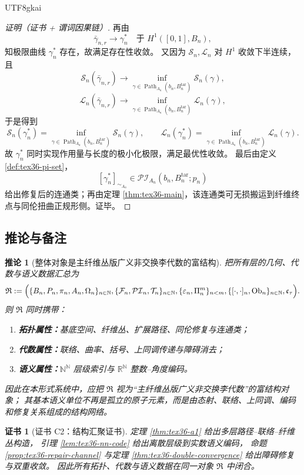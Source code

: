 \documentclass[12pt]{article}
\newtheorem{corollary}{推论}[section]
\newtheorem{Certificate}{证书}[section]
\newcommand{\NN}{\mathbb{N}}
\newcommand{\RR}{\mathbb{R}}
\newcommand{\Path}{\operatorname{Path}}
\newcommand{\Ob}{\operatorname{Ob}}
\begin{document}
\begin{CJK*}{UTF8}{gkai}
\begin{proof}[证明（证书 + 谓词因果链）]
再由
\[
  \bar{\gamma}_{n,r}\to \gamma_n^\ast
  \quad\text{于 } H^1([0,1],B_n),
\]
知极限曲线 $\gamma_n^\ast$ 存在，故满足存在性收敛。
又因为 $\mathcal S_n,\mathcal L_n$ 对 $H^1$ 收敛下半连续，且
\[
  \mathcal S_n(\bar{\gamma}_{n,r})
  \to
  \inf_{\gamma\in \Path_{A_n}(b_n,B_n^{\mathrm{tar}})}\mathcal S_n(\gamma),
\]
\[
  \mathcal L_n(\bar{\gamma}_{n,r})
  \to
  \inf_{\gamma\in \Path_{A_n}(b_n,B_n^{\mathrm{tar}})}\mathcal L_n(\gamma),
\]
于是得到
\[
  \mathcal S_n(\gamma_n^\ast)
  =
  \inf_{\gamma\in \Path_{A_n}(b_n,B_n^{\mathrm{tar}})}\mathcal S_n(\gamma),
\qquad
  \mathcal L_n(\gamma_n^\ast)
  =
  \inf_{\gamma\in \Path_{A_n}(b_n,B_n^{\mathrm{tar}})}\mathcal L_n(\gamma).
\]
故 $\gamma_n^\ast$ 同时实现作用量与长度的极小化极限，满足最优性收敛。
最后由定义 \ref{def:tex36-pi-set}，
\[
  [\gamma_n^\ast]_{\sim_{A_n}}
  \in \mathcal{PI}_{A_n}(b_n,B_n^{\mathrm{tar}};p_n)
\]
给出修复后的连通类；再由定理 \ref{thm:tex36-main}，该连通类可无损搬运到纤维终点与同伦扭曲正规形侧。证毕。
\end{proof}

\subsection{推论与备注}
\label{subsec:tex36-structure-remark}

\begin{corollary}[整体对象是主纤维丛版广义非交换李代数的富结构]
\label{cor:tex36-rich-structure}
把所有层的几何、代数与语义数据汇总为
\[
  \mathfrak R
  :=
  \Bigl(
    \{B_n,P_n,\pi_n,A_n,\Omega_n\}_{n\in\NN},
    \{\mathcal{F}_n,\mathcal{PI}_n,\mathcal{T}_n\}_{n\in\NN},
    \{\varepsilon_n,\Pi_n^m\}_{n<m},
    \{[\cdot,\cdot]_n,\Ob_n\}_{n\in\NN},
    \mathfrak c_{\tau}
  \Bigr).
\]
则 $\mathfrak R$ 同时携带：
\begin{enumerate}
  \item \textbf{拓扑属性：}基底空间、纤维丛、扩展路径、同伦修复与连通类；
  \item \textbf{代数属性：}联络、曲率、括号、上同调传递与障碍消去；
  \item \textbf{语义属性：}$\NN^\NN$ 层级索引与 $\RR^\NN$ 整数--角度编码。
\end{enumerate}
因此在本形式系统中，应把 $\mathfrak R$ 视为“主纤维丛版广义非交换李代数”的富结构对象；
其基本语义单位不再是孤立的原子元素，而是由态射、联络、上同调、编码和修复关系组成的结构网络。
\end{corollary}

\begin{Certificate}[证书 C2：结构汇聚证书]
\label{cert:tex36-c2}
定理 \ref{thm:tex36-a1} 给出多层路径--联络--纤维丛构造，
引理 \ref{lem:tex36-nn-code} 给出离散层级到实数语义编码，
命题 \ref{prop:tex36-repair-channel} 与定理 \ref{thm:tex36-double-convergence} 给出障碍修复与双重收敛。
因此所有拓扑、代数与语义数据在同一对象 $\mathfrak R$ 中闭合。
\end{Certificate}


\end{CJK*}
\end{document}
